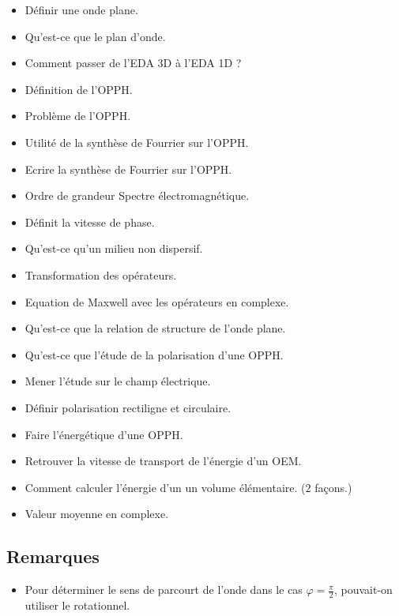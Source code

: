 \documentclass[a4paper, 11pt, hidelinks]{article}
\begin{document}
\begin{itemize}
    \item Définir une onde plane. \cite{Chapitre15}
    \item Qu'est-ce que le plan d'onde. \cite{Chapitre15}
    \item Comment passer de l'EDA 3D à l'EDA 1D ? \cite{Chapitre15}
    \item Définition de l'OPPH. \cite{Chapitre15}
    \item Problème de l'OPPH. \cite{Chapitre15}
    \item Utilité de la synthèse de Fourrier sur l'OPPH. \cite{Chapitre15}
    \item Ecrire la synthèse de Fourrier sur l'OPPH. \cite{Chapitre15}
    \item Ordre de grandeur Spectre électromagnétique. \cite{Chapitre15}
    \item Définit la vitesse de phase. \cite{Chapitre15}
    \item Qu'est-ce qu'un milieu non dispersif. \cite{Chapitre15}
    \item Transformation des opérateurs. \cite{Chapitre15}
    \item Equation de Maxwell avec les opérateurs en complexe. \cite{Chapitre15}
    \item Qu'est-ce que la relation de structure de l'onde plane. \cite{Chapitre15}
    \item Qu'est-ce que l'étude de la polarisation d'une OPPH. \cite{Chapitre15}
    \item Mener l'étude sur le champ électrique. \cite{Chapitre15}
    \item Définir polarisation rectiligne et circulaire. \cite{Chapitre15}
    \item Faire l'énergétique d'une OPPH. \cite{Chapitre15}
    \item Retrouver la vitesse de transport de l'énergie d'un OEM. \cite{Chapitre15}
    \item Comment calculer l'énergie d'un un volume élémentaire. ($2$ façons.) \cite{Chapitre15}
    \item Valeur moyenne en complexe. \cite{Chapitre15}
\end{itemize}


\subsection{Remarques}



\begin{itemize}
    \item Pour déterminer le sens de parcourt de l'onde dans le cas $\varphi=\frac{\pi}{2}$, pouvait-on utiliser le rotationnel.
\end{itemize}
\end{document}
